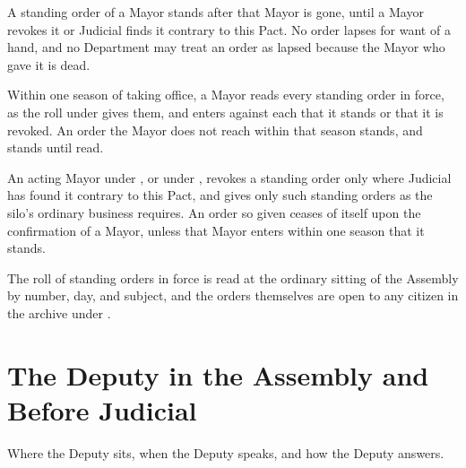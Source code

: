 \begin{clauses}
\item A standing order of a Mayor stands after that Mayor is gone, until a Mayor revokes it or Judicial finds it contrary to this Pact. No order lapses for want of a hand, and no Department may treat an order as lapsed because the Mayor who gave it is dead.
\item Within one season of taking office, a Mayor reads every standing order in force, as the roll under  gives them, and enters against each that it stands or that it is revoked. An order the Mayor does not reach within that season stands, and stands until read.
\item An acting Mayor under , or under , revokes a standing order only where Judicial has found it contrary to this Pact, and gives only such standing orders as the silo's ordinary business requires. An order so given ceases of itself upon the confirmation of a Mayor, unless that Mayor enters within one season that it stands.
\item The roll of standing orders in force is read at the ordinary sitting of the Assembly by number, day, and subject, and the orders themselves are open to any citizen in the archive under .
\end{clauses}

\section{The Deputy in the Assembly and Before Judicial}
\label{sec:succession:deputy-in-the-assembly-and-before-judicial}

Where the Deputy sits, when the Deputy speaks, and how the Deputy answers.

